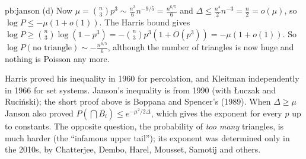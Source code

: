 \begin{solution}{pb:janson}
(d) Now $\mu=\binom n3p^3\sim\frac{n^3}6n^{-9/5}=\frac{n^{6/5}}6$ and $\Delta\le\frac{n^4}2n^{-3}=\frac n2=o(\mu)$, so $\log P\le-\mu(1+o(1))$. The Harris bound gives
$\log P\ge\binom n3\log(1-p^3)=-\binom n3p^3(1+O(p^3))=-\mu(1+o(1))$. So $\log P(\text{no triangle})\sim-\frac{n^{6/5}}6$, although the number of triangles is now huge and
nothing is Poisson any more.

\leads Harris proved his inequality in 1960 for percolation, and Kleitman independently in 1966 for set systems. Janson's inequality is from 1990 (with \L uczak and Ruci\'nski);
the short proof above is Boppana and Spencer's (1989). When $\Delta\ge\mu$ Janson also proved $P(\bigcap\overline{B_i})\le e^{-\mu^2/2\Delta}$, which gives the exponent for every
$p$ up to constants. The opposite question, the probability of \emph{too many} triangles, is much harder (the ``infamous upper tail''); its exponent was determined only in the
2010s, by Chatterjee, Dembo, Harel, Mousset, Samotij and others.
\end{solution}

